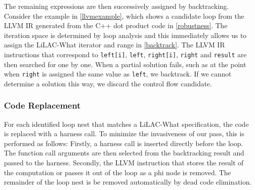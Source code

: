     The remaining expressions are then successively assigned by backtracking.
    Consider the example in \autoref{llvmexample}, which shows a candidate loop
    from the LLVM IR generated from the C++ dot product code in
    \autoref{robustness}.
    The iteration space is determined by loop analysis and this immediately
    allows us to assign the LiLAC-What iterator and range in
    \autoref{backtrack}.
    The LLVM IR instructions that correspond to \texttt{left[i]}, \texttt{left},
    \texttt{right[i]}, \texttt{right} and \texttt{result} are then searched for
    one by one.
    When a partial solution fails, such as at the point when \texttt{right} is
    assigned the same value as \texttt{left}, we backtrack.
    If we cannot determine a solution this way, we discard the control flow
    candidate.

\subsubsection{Code Replacement}

    For each identified loop nest that matches a LiLAC-What specification, the
    code is replaced with a harness call.
    To minimize the invasiveness of our pass, this is performed as follows:
    Firstly, a harness call is inserted directly before the loop.
    The function call arguments are then selected from the backtracking result
    and passed to the harness.
    Secondly, the LLVM instruction that stores the result of the computation or
    passes it out of the loop as a phi node is removed.
    The remainder of the loop nest is be removed automatically by dead code
    elimination.

